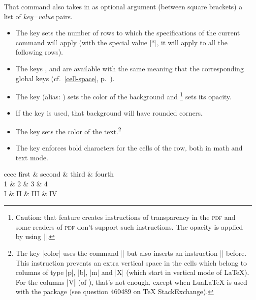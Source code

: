 \documentclass[dvipsnames]{article}
\begin{document}
\medskip
That command also takes in as optional argument (between square brackets)
a list of \textsl{key=value} pairs. 
\begin{itemize}
\item {}
The key  sets the number of rows to which the specifications of
the current command will apply (with the special value |*|, it will apply to all
the following rows).
\item The keys , 
and  are available with the same meaning that the
corresponding global keys (cf.~\ref{cell-space}, p.~\pageref{cell-space}).
\item {}
The key  (alias: ) sets the color of the
background and \footnote{Caution: that feature creates instructions of
  transparency in the \textsc{pdf} and some readers of \textsc{pdf} don't
  support such instructions. The opacity is applied by using |\pgfsetfillopacity|.}
sets its opacity.

\item If the key  is used, that background will have
rounded corners.

\item 
{}
The key  sets the color of the text.\footnote{The key
  |color| uses the command |\color| but also inserts an instruction
  |\leavevmode| before. This instruction prevents an extra vertical space in the
  cells which belong to columns of type |p|, |b|, |m| and |X| (which start in
  vertical mode of LaTeX). For the columns |V| (of ), that's not
  enough, except when LuaLaTeX is used with the package  (see
  question 460489 on TeX StackExchange).}
\item {} The key
 enforces bold characters for the cells of the row, both in
math and text mode. 
\end{itemize}

\medskip
\begin{Code}[width=12cm,show-output,no-cell-nodes]
\begin{NiceTabular}{cccc}
  \hline
  \emph{\RowStyle[cell-space-limits=3pt]{\rotate}}
  first & second & third & fourth \\
  \emph{\RowStyle[nb-rows=2,fill=blue!50,color=white]{\sffamily}}
  1 & 2 & 3 & 4 \\
  I & II & III & IV 
\end{NiceTabular}
\end{Code}
\end{document}
